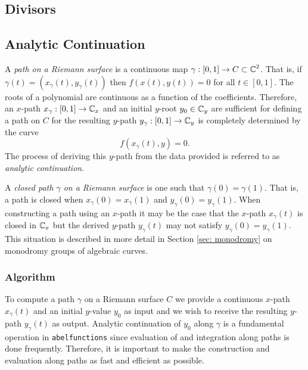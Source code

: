 \subsection{Divisors}\label{subsec:background-divisors}

\subsection{Analytic Continuation}\label{subsec:background-analytic-continuation}


A {\it path on a Riemann surface} is a continuous map $\gamma : [0,1] \to C
\subset \operatorname{\mathbb{C}}^2$. That is, if $\gamma(t) = (x_\gamma(t), y_\gamma(t))$ then
$f(x(t),y(t)) = 0$ for all $t \in [0,1]$. The roots of a polynomial are
continuous as a function of the coefficients. Therefore, an $x$-path $x_\gamma :
[0,1] \to \operatorname{\mathbb{C}}_x$ and an initial $y$-root $y_0 \in \operatorname{\mathbb{C}}_y$ are sufficient for
defining a path on $C$ for the resulting $y$-path $y_\gamma : [0,1] \to \operatorname{\mathbb{C}}_y$
is completely determined by the curve
\[
  f(x_\gamma(t),y) = 0.
\]
The process of deriving this $y$-path from the data provided is referred to as
{\it analytic continuation}.

A {\it closed path $\gamma$ on a Riemann surface} is one such that $\gamma(0) =
\gamma(1)$. That is, a path is closed when $x_\gamma(0) = x_\gamma(1)$ and
$y_\gamma(0) = y_\gamma(1)$. When constructing a path using an $x$-path it may
be the case that the $x$-path $x_\gamma(t)$ is closed in $\operatorname{\mathbb{C}}_x$ but the derived
$y$-path $y_\gamma(t)$ may not satisfy $y_\gamma(0) = y_\gamma(1)$. This
situation is described in more detail in Section \ref{sec: monodromy} on
monodromy groups of algebraic curves.

%
\subsubsection*{Algorithm}
%

To compute a path $\gamma$ on a Riemann surface $C$ we provide a continuous
$x$-path $x_\gamma(t)$ and an initial $y$-value $y_0$ as input and we wish to
receive the resulting $y$-path $y_\gamma(t)$ as output. Analytic continuation of
$y_0$ along $\gamma$ is a fundamental operation in {\tt abelfunctions} since
evaluation of and integration along paths is done frequently. Therefore, it is
important to make the construction and evaluation along paths as fast and
efficient as possible.

